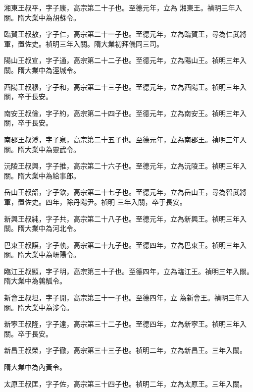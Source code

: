 \begin{pinyinscope}
 湘東王叔平，字子康，高宗第二十子也。至德元年，立為
 湘東王。禎明三年入關。隋大業中為胡蘇令。



 臨賀王叔敖，字子仁，高宗第二十一子也。至德元年，立為臨賀王，尋為仁武將軍，置佐史。禎明三年入關。隋大業初拜儀同三司。



 陽山王叔宣，字子通，高宗第二十二子也。至德元年，立為陽山王。禎明三年入關。隋大業中為涇城令。



 西陽王叔穆，字子和，高宗第二十三子也。至德元年，立為西陽王。禎明三年入關，卒于長安。



 南安王叔儉，字子約，高宗第二十四子也。至德元年，立為南安王。禎明三年入關，卒于長安。



 南郡王叔澄，字子泉，高宗第二十五子也。至德元年，立為南郡王。禎明三年入關。隋大業中為靈武令。



 沅陵王叔興，字子推，高宗第二十六子也。至德元年，立為沅陵王。禎明三年入關。隋大業中為給事郎。



 岳山王叔韶，字子欽，高宗第二十七子也。至德元年，立為岳山王，尋為智武將軍，置佐史。四年，除丹陽尹。禎明
 三年入關，卒于長安。



 新興王叔純，字子共，高宗第二十八子也。至德元年，立為新興王。禎明三年入關。隋大業中為河北令。



 巴東王叔謨，字子軌，高宗第二十九子也。至德四年，立為巴東王。禎明三年入關。隋大業中為岍陽令。



 臨江王叔顯，字子明，高宗第三十子也。至德四年，立為臨江王。禎明三年入關。隋大業中為鶉觚令。



 新會王叔坦，字子開，高宗第三十一子也。至德四年，立
 為新會王。禎明三年入關。隋大業中為涉令。



 新寧王叔隆，字子遠，高宗第三十二子也。至德四年，立為新寧王。禎明三年入關。卒于長安。



 新昌王叔榮，字子徹，高宗第三十三子也。禎明二年，立為新昌王。三年入關。



 隋大業中為內黃令。



 太原王叔匡，字子佐，高宗第三十四子也。禎明二年，立為太原王。三年入關。




\end{pinyinscope}
